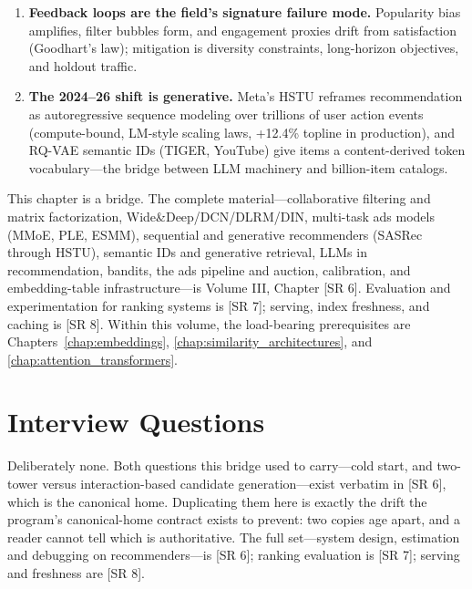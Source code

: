 \begin{enumerate}
    \item \textbf{Feedback loops are the field's signature failure mode.} Popularity bias amplifies, filter bubbles form, and engagement proxies drift from satisfaction (Goodhart's law); mitigation is diversity constraints, long-horizon objectives, and holdout traffic.
    \item \textbf{The 2024--26 shift is generative.} Meta's HSTU reframes recommendation as autoregressive sequence modeling over trillions of user action events (compute-bound, LM-style scaling laws, +12.4\% topline in production), and RQ-VAE semantic IDs (TIGER, YouTube) give items a content-derived token vocabulary---the bridge between LLM machinery and billion-item catalogs.
\end{enumerate}

\begin{keyinsight}
This chapter is a bridge. The complete material---collaborative filtering and matrix factorization, Wide\&Deep/DCN/DLRM/DIN, multi-task ads models (MMoE, PLE, ESMM), sequential and generative recommenders (SASRec through HSTU), semantic IDs and generative retrieval, LLMs in recommendation, bandits, the ads pipeline and auction, calibration, and embedding-table infrastructure---is Volume III, Chapter [SR 6]. Evaluation and experimentation for ranking systems is [SR 7]; serving, index freshness, and caching is [SR 8]. Within this volume, the load-bearing prerequisites are Chapters~\ref{chap:embeddings}, \ref{chap:similarity_architectures}, and \ref{chap:attention_transformers}.
\end{keyinsight}

\section{Interview Questions}
\label{sec:recsys_interview}

Deliberately none. Both questions this bridge used to carry---cold start, and
two-tower versus interaction-based candidate generation---exist verbatim in
[SR 6], which is the canonical home. Duplicating them here is exactly the drift
the program's canonical-home contract exists to prevent: two copies age apart,
and a reader cannot tell which is authoritative. The full set---system design,
estimation and debugging on recommenders---is [SR 6]; ranking evaluation is
[SR 7]; serving and freshness are [SR 8].
